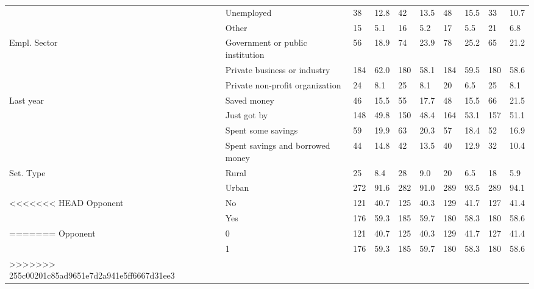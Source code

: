 \begin{table}
\begin{tabular}[t]{llllllllll}
 & Unemployed & 38 & 12.8 & 42 & 13.5 & 48 & 15.5 & 33 & 10.7\\
 & Other & 15 & 5.1 & 16 & 5.2 & 17 & 5.5 & 21 & 6.8\\
Empl. Sector & Government or public institution & 56 & 18.9 & 74 & 23.9 & 78 & 25.2 & 65 & 21.2\\
 & Private business or industry & 184 & 62.0 & 180 & 58.1 & 184 & 59.5 & 180 & 58.6\\
 & Private non-profit organization & 24 & 8.1 & 25 & 8.1 & 20 & 6.5 & 25 & 8.1\\
Last year & Saved money & 46 & 15.5 & 55 & 17.7 & 48 & 15.5 & 66 & 21.5\\
 & Just got by & 148 & 49.8 & 150 & 48.4 & 164 & 53.1 & 157 & 51.1\\
 & Spent some savings & 59 & 19.9 & 63 & 20.3 & 57 & 18.4 & 52 & 16.9\\
 & Spent savings and
borrowed money & 44 & 14.8 & 42 & 13.5 & 40 & 12.9 & 32 & 10.4\\
Set. Type & Rural & 25 & 8.4 & 28 & 9.0 & 20 & 6.5 & 18 & 5.9\\
 & Urban & 272 & 91.6 & 282 & 91.0 & 289 & 93.5 & 289 & 94.1\\
<<<<<<< HEAD
Opponent & No & 121 & 40.7 & 125 & 40.3 & 129 & 41.7 & 127 & 41.4\\
 & Yes & 176 & 59.3 & 185 & 59.7 & 180 & 58.3 & 180 & 58.6\\
=======
Opponent & 0 & 121 & 40.7 & 125 & 40.3 & 129 & 41.7 & 127 & 41.4\\
 & 1 & 176 & 59.3 & 185 & 59.7 & 180 & 58.3 & 180 & 58.6\\
>>>>>>> 255c00201c85ad9651e7d2a941e5ff6667d31ee3
\bottomrule
\end{tabular}
\end{table}
